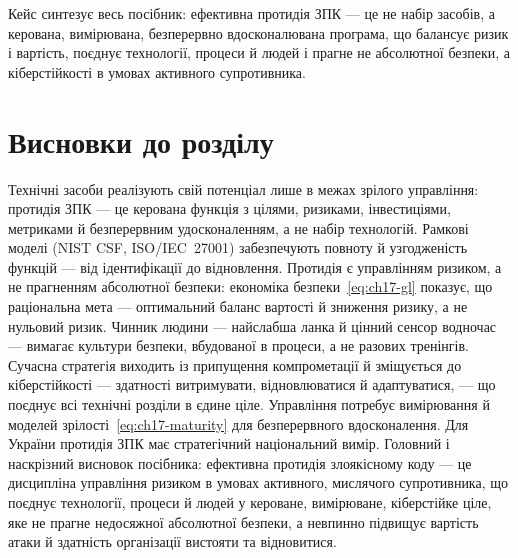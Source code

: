 Кейс синтезує весь посібник: ефективна протидія ЗПК --- це не набір засобів, а керована, вимірювана, безперервно вдосконалювана програма, що балансує ризик і вартість, поєднує технології, процеси й людей і прагне не абсолютної безпеки, а кіберстійкості в умовах активного супротивника.

\section*{Висновки до розділу}

Технічні засоби реалізують свій потенціал лише в межах зрілого управління: протидія ЗПК --- це керована функція з цілями, ризиками, інвестиціями, метриками й безперервним удосконаленням, а не набір технологій. Рамкові моделі (NIST CSF, ISO/IEC~27001) забезпечують повноту й узгодженість функцій --- від ідентифікації до відновлення. Протидія є управлінням ризиком, а не прагненням абсолютної безпеки: економіка безпеки~\eqref{eq:ch17-gl} показує, що раціональна мета --- оптимальний баланс вартості й зниження ризику, а не нульовий ризик. Чинник людини --- найслабша ланка й цінний сенсор водночас --- вимагає культури безпеки, вбудованої в процеси, а не разових тренінгів. Сучасна стратегія виходить із припущення компрометації й зміщується до кіберстійкості --- здатності витримувати, відновлюватися й адаптуватися, --- що поєднує всі технічні розділи в єдине ціле. Управління потребує вимірювання й моделей зрілості~\eqref{eq:ch17-maturity} для безперервного вдосконалення. Для України протидія ЗПК має стратегічний національний вимір. Головний і наскрізний висновок посібника: ефективна протидія злоякісному коду --- це дисципліна управління ризиком в умовах активного, мислячого супротивника, що поєднує технології, процеси й людей у кероване, вимірюване, кіберстійке ціле, яке не прагне недосяжної абсолютної безпеки, а невпинно підвищує вартість атаки й здатність організації вистояти та відновитися.

